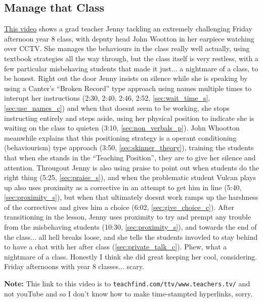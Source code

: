 \documentclass[12pt]{report}
\begin{document}
\begin{appendices}
\section{Manage that Class}
\label{video:3}

\href{http://archive.teachfind.com/ttv/www.teachers.tv/videos/manage-that-class-year-8-friday.html}{This video} shows a grad teacher Jenny tackling an extremely challenging Friday afternoon year 8 class, with deputy head John Wootton in her earpiece watching over CCTV. She manages the behaviours in the class really well actually, using textbook strategies all the way through, but the class itself is very restless, with a few particular misbehaving students that made it just... a nightmare of a class, to be honest. Right out the door Jenny insists on silence while she is speaking by using a Canter's ``Broken Record'' type approach using names multiple times to interupt her instructions (2:30, 2:40, 2:46, 2:52, \ref{sec:wait_time_s}, \ref{sec:use_names_c}) and when that doesnt seem to be working, she stops instructing entirely and steps aside, using her physical position to indicate she is waiting on the class to quieten (3:10, \ref{sec:non_verbals_p}). John Whootton meanwhile explains that this positioning strategy is a operant conditioning (behaviourism) type approach (3:50, \ref{sec:skinner_theory}), training the students that when she stands in the ``Teaching Position'', they are to give her silence and attention. Througout Jenny is also using praise to point out when students do the right thing (5:25, \ref{sec:praise_s}), and when the problematic student Vulcan plays up also uses proximity as a corrective in an attempt to get him in line (5:40, \ref{sec:proximity_s}), but when that ultimately doesnt work ramps up the harshness of the correctives and gives him a choice (6:02, \ref{sec:give_choice_c}). After transitioning in the lesson, Jenny uses proximity to try and prempt any trouble from the misbehaving students (10:30, \ref{sec:proximity_s}), and towards the end of the class... all hell breaks loose, and she tells the students invovled to stay behind to have a chat with her after class (\ref{sec:private_talk_c}). Phew, what a nightmare of a class. Honestly I think she did great keeping her cool, considering. Friday afternoons with year 8 classes... scary.

\textbf{Note:} This link to this video is to \texttt{teachfind.com/ttv/www.teachers.tv/} and not youTube and so I don't know how to make time-stampted hyperlinks, sorry.






\end{appendices}
\end{document}
